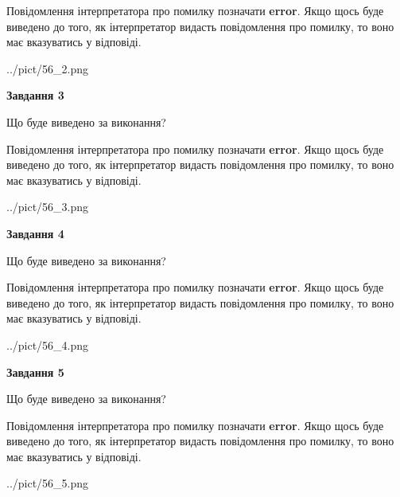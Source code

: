 \documentclass[12pt, ukrainian]{article}
\begin{document}
{\begin {large}
Повідомлення інтерпретатора про помилку позначати \textbf{error}.
Якщо щось буде виведено до того, як інтерпретатор видасть повідомлення про помилку, 
то воно має вказуватись у відповіді. \par


\begin{center}
	{../pict/56_2.png}
\end{center}
\newpage

{\begin {center}\textbf{Завдання 3}\end {center}}\par
Що буде виведено за виконання?

Повідомлення інтерпретатора про помилку позначати \textbf{error}.
Якщо щось буде виведено до того, як інтерпретатор видасть повідомлення про помилку, 
то воно має вказуватись у відповіді. \par


\begin{center}
	{../pict/56_3.png}
\end{center}
\newpage

{\begin {center}\textbf{Завдання 4}\end {center}}\par
Що буде виведено за виконання?

Повідомлення інтерпретатора про помилку позначати \textbf{error}.
Якщо щось буде виведено до того, як інтерпретатор видасть повідомлення про помилку, 
то воно має вказуватись у відповіді. \par


\begin{center}
	{../pict/56_4.png}
\end{center}
\newpage

{\begin {center}\textbf{Завдання 5}\end {center}}\par
Що буде виведено за виконання?

Повідомлення інтерпретатора про помилку позначати \textbf{error}.
Якщо щось буде виведено до того, як інтерпретатор видасть повідомлення про помилку, 
то воно має вказуватись у відповіді. \par


\begin{center}
	{../pict/56_5.png}
\end{center}
\newpage


\end{large}}
\end{document}
